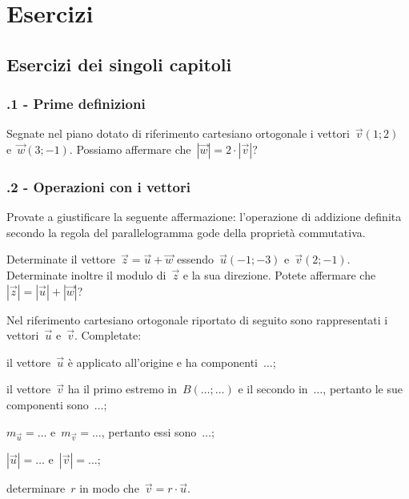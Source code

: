 
\section{Esercizi}

\subsection{Esercizi dei singoli capitoli}

\subsubsection*{\thechapter.1 - Prime definizioni}
\begin{esercizio}
\label{ese:F.1}
Segnate nel piano dotato di riferimento cartesiano ortogonale i vettori~$\vec{v}(1;2)$ e~$\vec{w}(3;-1)$. Possiamo affermare che~$|\vec{w}|=2 \cdot |\vec{v}|$?
\end{esercizio}

\subsubsection*{\thechapter.2 - Operazioni con i vettori}
\begin{esercizio}
\label{ese:F.2}
Provate a giustificare la seguente affermazione: l'operazione di addizione definita secondo la regola del parallelogramma gode della proprietà commutativa.
\end{esercizio}

\begin{esercizio}
\label{ese:F.3}
Determinate il vettore~$\vec{z}=\vec{u}+\vec{w}$ essendo~$\vec{u}(-1;-3)$ e~$\vec{v}(2;-1)$. Determinate inoltre il modulo di~$\vec{z}$ e la sua direzione.
Potete affermare che~$|\vec{z}|=|\vec{u}|+|\vec{w}|$?
\end{esercizio}

\begin{esercizio}
\label{ese:F.4}
Nel riferimento cartesiano ortogonale riportato di seguito sono rappresentati i vettori~$\vec{u}$ e~$\vec{v}$. Completate:

\begin{enumeratea}
\item il vettore~$\vec{u}$ è applicato all'origine e ha componenti~$\ldots$;
\item il vettore~$\vec{v}$ ha il primo estremo in~$B(\ldots;\ldots)$ e il secondo in~$\ldots$, pertanto le sue componenti sono~$\ldots$;
\item $m_{\vec{u}}=\ldots$ e~$m_{\vec{v}}=\ldots$, pertanto essi sono~$\ldots$;
\item $|\vec{u}|=\ldots$ e~$|\vec{v}|=\ldots$;
\item determinare~$r$ in modo che~$\vec{v}=r \cdot \vec{u}$.
\end{enumeratea}
\begin{center}
 
\end{center}

\end{esercizio}

